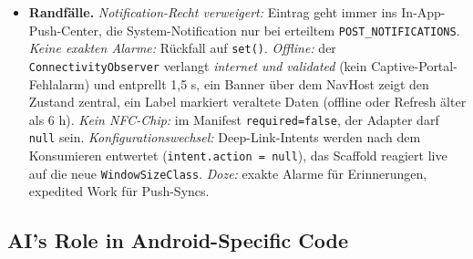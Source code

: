 \documentclass{msereport}
\begin{document}
\begin{itemize}
        schickt keine Nutzdaten, nur einen Typ-Marker (Server fertig, Deployment
        steht aus; der App-seitige Empfangspfad ist komplett implementiert). Die
        Entscheidungslogik (,,soll dieser Tickle einen Sync auslösen?{}``) ist von
        Firebase entkoppelt und als JVM-Test lauffähig. Den
        \texttt{FirebaseMessagingService} instanziiert das SDK, nicht Hilt, daher
        ein eigener EntryPoint; Vorbedingungen liest er blockierend, weil der
        Callback ohnehin im Hintergrund-Thread läuft. Gearbeitet wird in einem
        \emph{expedited} \texttt{MailPushSyncWorker}
        (\texttt{RUN\_AS\_NON\_EXPEDITED} als Fallback, \texttt{KEEP} gegen
        Tickle-Bursts), weil der Service-Prozess nach dem Callback endet; der
        Worker prüft die Zugangsdaten erneut und klassifiziert Fehler in
        \texttt{retry} und \texttt{failure}. Der periodische
        \texttt{LsfSyncWorker} arbeitet Kurse, Stundenplan, Klausuren und
        Notenspiegel mit 400 ms Drossel ab; Auth-Fehler bis zu zweimal
        wiederholt, damit die CAS-Session sich still erneuert, ein Parse-Fehler
        bricht den Lauf \emph{nicht} ab, sondern erzeugt eine entduplizierte
        Warnung im Push-Center (,,Klausurtermine veraltet``). Das kritischste
        Detail steckt in der Session: CAS bindet das Ticket-Granting-Cookie an
        den User-Agent des ausstellenden WebViews; ohne dessen Replay löscht der
        Server es beim nächsten Request.
  \item \textbf{Randfälle.} \emph{Notification-Recht verweigert:} Eintrag geht
        immer ins In-App-Push-Center, die System-Notification nur bei erteiltem
        \texttt{POST\_NOTIFICATIONS}. \emph{Keine exakten Alarme:} Rückfall auf
        \texttt{set()}. \emph{Offline:} der \texttt{ConnectivityObserver}
        verlangt \emph{internet} \emph{und} \emph{validated} (kein
        Captive-Portal-Fehlalarm) und entprellt 1{,}5 s, ein Banner über dem
        NavHost zeigt den Zustand zentral, ein Label markiert veraltete Daten
        (offline oder Refresh älter als 6 h). \emph{Kein NFC-Chip:} im Manifest
        \texttt{required=false}, der Adapter darf \texttt{null} sein.
        \emph{Konfigurationswechsel:} Deep-Link-Intents werden nach dem
        Konsumieren entwertet (\texttt{intent.action = null}), das Scaffold
        reagiert live auf die neue \texttt{WindowSizeClass}. \emph{Doze:} exakte
        Alarme für Erinnerungen, expedited Work für Push-Syncs.
\end{itemize}

\subsection{AI's Role in Android-Specific Code}
\end{document}

